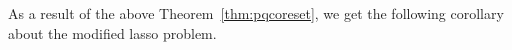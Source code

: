 As a result of the above Theorem~\ref{thm:pqcoreset}, we get the following corollary about the modified lasso problem.




